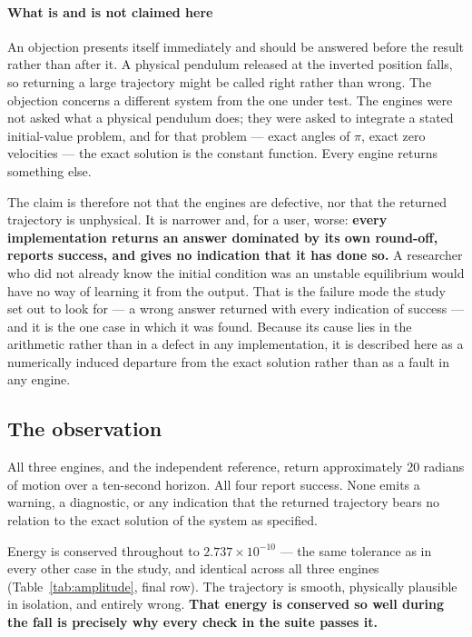 \documentclass[review,12pt]{elsarticle}
\begin{document}
\paragraph{What is and is not claimed here}
An objection presents itself immediately and should be answered before the
result rather than after it. A physical pendulum released at the inverted
position falls, so returning a large trajectory might be called right rather
than wrong. The objection concerns a different system from the one under test.
The engines were
not asked what a physical pendulum does; they were asked to integrate a stated
initial-value problem, and for that problem --- exact angles of $\pi$, exact zero
velocities --- the exact solution is the constant function. Every engine returns
something else.

The claim is therefore not that the engines are defective, nor that the returned
trajectory is unphysical. It is narrower and, for a user, worse: \textbf{every
implementation returns an answer dominated by its own round-off, reports
success, and gives no indication that it has done so.} A researcher who did not
already know the initial condition was an unstable equilibrium would have no way
of learning it from the output. That is the failure mode the study set out to
look for --- a wrong answer returned with every indication of success --- and it
is the one case in which it was found. Because its cause lies in the arithmetic
rather than in a defect in any implementation, it is described here as a
numerically induced departure from the exact solution rather than as a fault in
any engine.

\subsection{The observation}\label{sec:observation}
All three engines, and the independent reference, return approximately 20
radians of motion over a ten-second horizon. All four report success. None emits
a warning, a diagnostic, or any indication that the returned trajectory bears no
relation to the exact solution of the system as specified.

Energy is conserved throughout to $2.737\times10^{-10}$ --- the same tolerance
as in every other case in the study, and identical across all three engines
(Table~\ref{tab:amplitude}, final row). The trajectory is smooth, physically
plausible in isolation, and entirely wrong. \textbf{That energy is conserved so
well during the fall is precisely why every check in the suite passes it.}
\end{document}
